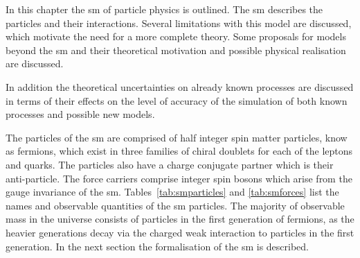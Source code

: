 
In this chapter the \ac{sm} of particle physics is outlined. The 
\ac{sm} describes the particles and their interactions. Several limitations 
with this model are discussed, which motivate the need for a more complete 
theory. Some proposals for models beyond the \ac{sm} and their theoretical 
motivation and possible physical realisation are discussed.

In addition the theoretical uncertainties on already known processes are 
discussed in terms of their effects on the level of accuracy of the simulation 
of both known processes and possible new models.

The particles of the \ac{sm} are comprised of half integer spin matter 
particles, know as fermions, which exist in three families of chiral doublets 
for each of the leptons and quarks. The particles also have a charge conjugate partner which is their anti-particle.
The force carriers comprise integer spin bosons which arise from the 
gauge invariance of the \ac{sm}. Tables~\ref{tab:smparticles} and 
\ref{tab:smforces} list the names and observable quantities of the \ac{sm} 
particles. The majority of observable mass in the universe consists of 
particles in the first generation of fermions, as the heavier generations decay 
via the charged weak interaction to particles in the first generation.
In the next section the formalisation of the \ac{sm} is described.

